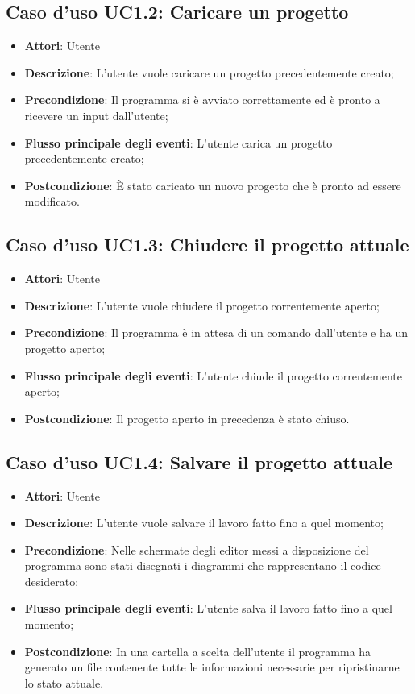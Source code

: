 \documentclass[../AnalisiDeiRequisiti.tex]{subfiles}
\begin{document}
	\subsection{Caso d'uso UC1.2: Caricare un progetto}
	\begin{itemize}
		\item \textbf{Attori}: Utente
		\item \textbf{Descrizione}: L'utente vuole caricare un progetto precedentemente creato;
		\item \textbf{Precondizione}: Il programma si è avviato correttamente ed è pronto a ricevere un input dall'utente;
		\item \textbf{Flusso principale degli eventi}: L'utente carica un progetto precedentemente creato;
		\item \textbf{Postcondizione}: È stato caricato un nuovo progetto che è pronto ad essere modificato.
	\end{itemize}
	\subsection{Caso d'uso UC1.3: Chiudere il progetto attuale}
	\begin{itemize}
		\item \textbf{Attori}: Utente
		\item \textbf{Descrizione}: L'utente vuole chiudere il progetto correntemente aperto;
		\item \textbf{Precondizione}: Il programma è in attesa di un comando dall'utente e ha un progetto aperto;
		\item \textbf{Flusso principale degli eventi}: L'utente chiude il progetto correntemente aperto;
		\item \textbf{Postcondizione}: Il progetto aperto in precedenza è stato chiuso.
	\end{itemize}
	\subsection{Caso d'uso UC1.4: Salvare il progetto attuale}
	\begin{itemize}
		\item \textbf{Attori}: Utente
		\item \textbf{Descrizione}: L'utente vuole salvare il lavoro fatto fino a quel momento;
		\item \textbf{Precondizione}: Nelle schermate degli editor messi a disposizione del programma sono stati disegnati i diagrammi che rappresentano il codice desiderato;
		\item \textbf{Flusso principale degli eventi}: L'utente salva il lavoro fatto fino a quel momento;
		\item \textbf{Postcondizione}: In una cartella a scelta dell'utente il programma ha generato un file contenente tutte le informazioni necessarie per ripristinarne lo stato attuale.
	\end{itemize}
\end{document}
